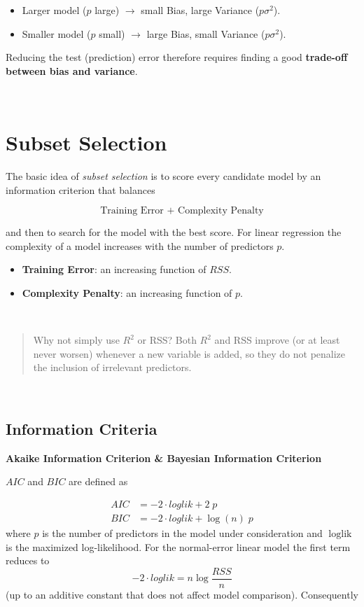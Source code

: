 \documentclass[
]{book}
\begin{document}
\begin{itemize}
\item
  Larger model (\(p\) large) \(\rightarrow\) small Bias, large Variance (\(p\sigma^2\)).
\item
  Smaller model (\(p\) small) \(\rightarrow\) large Bias, small Variance (\(p\sigma^2\)).
\end{itemize}

Reducing the test (prediction) error therefore requires finding a good \textbf{trade-off between bias and variance}.

~

\section{Subset Selection}\label{subset-selection}

The basic idea of \emph{subset selection} is to score every candidate model by an information criterion that balances

\[\text{Training Error + Complexity Penalty}\]

and then to search for the model with the best score. For linear regression the complexity of a model increases with the number of predictors \(p\).

\begin{itemize}
\item
  \textbf{Training Error}: an increasing function of \(RSS\).
\item
  \textbf{Complexity Penalty}: an increasing function of \(p\).
\end{itemize}

~

\begin{quote}
Why not simply use \(R^2\) or RSS? Both \(R^2\) and RSS improve (or at least never worsen) whenever a new variable is added, so they do not penalize the inclusion of irrelevant predictors.
\end{quote}

~

\subsection{Information Criteria}\label{information-criteria}

\textbf{Akaike Information Criterion \& Bayesian Information Criterion}

\(AIC\) and \(BIC\) are defined as

\begin{align*}
AIC &= -2\cdot loglik  + 2\; p \\
BIC &= -2\cdot loglik  + \log(n)\; p
\end{align*}
where \(p\) is the number of predictors in the model under consideration and \(\log\text{lik}\) is the maximized log-likelihood. For the normal-error linear model the first term reduces to
\[-2 \cdot  loglik = n\log \frac{RSS}{n} \]
(up to an additive constant that does not affect model comparison). Consequently
\end{document}
